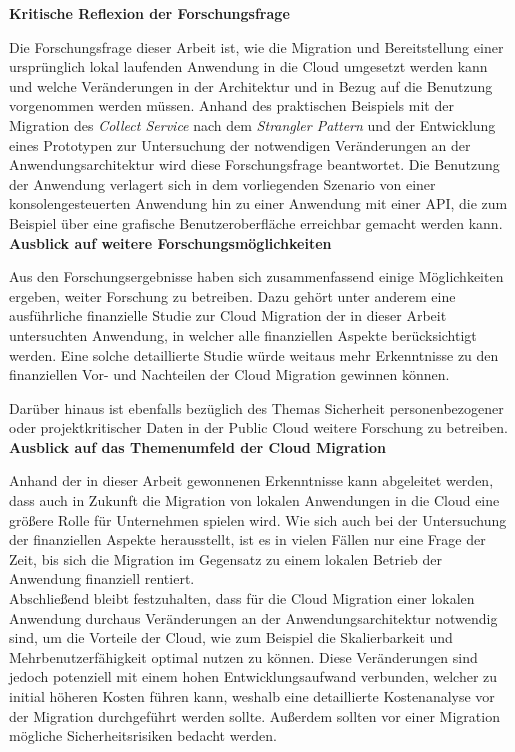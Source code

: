 \textbf{Kritische Reflexion der Forschungsfrage}

Die Forschungsfrage dieser Arbeit ist, wie die Migration und Bereitstellung einer ursprünglich lokal laufenden Anwendung in die Cloud umgesetzt werden kann und welche Veränderungen in der Architektur und in Bezug auf die Benutzung vorgenommen werden müssen. Anhand des praktischen Beispiels mit der Migration des \textit{Collect Service} nach dem \textit{Strangler Pattern} und der Entwicklung eines Prototypen zur Untersuchung der notwendigen Veränderungen an der Anwendungsarchitektur wird diese Forschungsfrage beantwortet. Die Benutzung der Anwendung verlagert sich in dem vorliegenden Szenario von einer konsolengesteuerten Anwendung hin zu einer Anwendung mit einer \ac{API}, die zum Beispiel über eine grafische Benutzeroberfläche erreichbar gemacht werden kann. \\

\textbf{Ausblick auf weitere Forschungsmöglichkeiten}

Aus den Forschungsergebnisse haben sich zusammenfassend einige Möglichkeiten ergeben, weiter Forschung zu betreiben. Dazu gehört unter anderem eine ausführliche finanzielle Studie zur Cloud Migration der in dieser Arbeit untersuchten Anwendung, in welcher alle finanziellen Aspekte berücksichtigt werden. Eine solche detaillierte Studie würde weitaus mehr Erkenntnisse zu den finanziellen Vor- und Nachteilen der Cloud Migration gewinnen können.

Darüber hinaus ist ebenfalls bezüglich des Themas Sicherheit personenbezogener oder projektkritischer Daten in der Public Cloud weitere Forschung zu betreiben. \\

\textbf{Ausblick auf das Themenumfeld der Cloud Migration}

Anhand der in dieser Arbeit gewonnenen Erkenntnisse kann abgeleitet werden, dass auch in Zukunft die Migration von lokalen Anwendungen in die Cloud eine größere Rolle für Unternehmen spielen wird. Wie sich auch bei der Untersuchung der finanziellen Aspekte herausstellt, ist es in vielen Fällen nur eine Frage der Zeit, bis sich die Migration im Gegensatz zu einem lokalen Betrieb der Anwendung finanziell rentiert. \\

Abschließend bleibt festzuhalten, dass für die Cloud Migration einer lokalen Anwendung durchaus Veränderungen an der Anwendungsarchitektur notwendig sind, um die Vorteile der Cloud, wie zum Beispiel die Skalierbarkeit und Mehrbenutzerfähigkeit optimal nutzen zu können. Diese Veränderungen sind jedoch potenziell mit einem hohen Entwicklungsaufwand verbunden, welcher zu initial höheren Kosten führen kann, weshalb eine detaillierte Kostenanalyse vor der Migration durchgeführt werden sollte. Außerdem sollten vor einer Migration mögliche Sicherheitsrisiken bedacht werden.